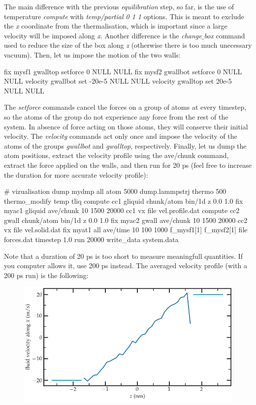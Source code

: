 \noindent The main difference with the previous \textit{equilibration} step, so far, is
the use of temperature \textit{compute} with \textit{temp/partial 0 1 1} options.
This is meant to exclude the \textit{x} coordinate from the thermalisation, which is 
important since a large velocity will be imposed along \textit{x}. Another difference is the
\textit{change$\_$box} command used to reduce the size of the box along \textit{z} (otherwise there 
is too much unecessary vacuum).
Then, let us impose the motion of the two walls:

\begin{lcverbatim}
fix mysf1 gwalltop setforce 0 NULL NULL
fix mysf2 gwallbot setforce 0 NULL NULL
velocity gwallbot set -20e-5 NULL NULL
velocity gwalltop set 20e-5 NULL NULL
\end{lcverbatim}

\noindent The \textit{setforce} commands cancel the forces on a group of atoms at
every timestep, so the atoms of the group do not
experience any force from the rest of the system. In absence of force
acting on those atoms, they will conserve their initial velocity.
The \textit{velocity} commands act only once and impose
the velocity of the atoms of the groups \textit{gwallbot} and \textit{gwalltop}, respectively.
Finally, let us dump the atom positions, extract the
velocity profile using the ave/chunk command, extract the
force applied on the walls, and then run for 20 ps (feel free to increase the duration 
for more accurate velocity profile):

\begin{lcverbatim}
# vizualisation
dump mydmp all atom 5000 dump.lammpstrj
thermo 500
thermo_modify temp tliq
compute cc1 gliquid chunk/atom bin/1d z 0.0 1.0
fix myac1 gliquid ave/chunk 10 1500 20000 cc1 vx file vel.profile.dat
compute cc2 gwall chunk/atom bin/1d z 0.0 1.0
fix myac2 gwall ave/chunk 10 1500 20000 cc2 vx file vel.solid.dat
fix myat1 all ave/time 10 100 1000 f_mysf1[1] f_mysf2[1] file forces.dat
timestep 1.0
run 20000
write_data system.data
\end{lcverbatim}

\noindent Note that a duration of 20 ps is too short to measure meaningfull quantities.
If you computer allows it, use 200 ps instead.
The averaged velocity profile (with a 200 ps run) is the following:

\begin{figure}
\includegraphics[width=\linewidth]{tutorials/level2/nanosheared-electrolyte/shearing-light.png}
\end{figure}

